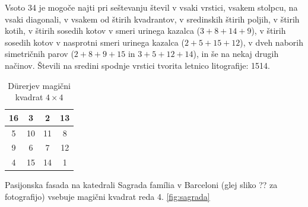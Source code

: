 \documentclass[a4paper,12pt]{article}
\begin{document}
Vsoto 34 je mogoče najti pri seštevanju števil v vsaki vrstici, vsakem stolpcu,
na vsaki diagonali, v vsakem od štirih kvadrantov, v sredinskih štirih poljih,
v štirih kotih, v štirih sosedih kotov v smeri urinega kazalca ($3+8+14+9$), v
štirih sosedih kotov v nasprotni smeri urinega kazalca ($2+5+15+12$), v dveh naborih
simetričnih parov ($2+8+9+15$ in $3+5+12+14$), in še na nekaj drugih načinov.
Števili na sredini spodnje vrstici tvorita letnico litografije: 1514.
%
\begin{table}[h!]
   \centering
   \caption{Dürerjev magični kvadrat $4\times 4$}
   \label{durer}
   \begin{tabular}{|c|c|c|c|}
      \hline
      16 &  3 &  2 & 13 \\\hline
       5 & 10 & 11 &  8 \\\hline
       9 &  6 &  7 & 12 \\\hline
       4 & 15 & 14 &  1 \\\hline
   \end{tabular}
\end{table}
Pasijonska fasada na katedrali Sagrada família v Barceloni
(glej sliko ?? za fotografijo) vsebuje magični kvadrat reda 4.
\ref{fig:sagrada}
\end{document}
